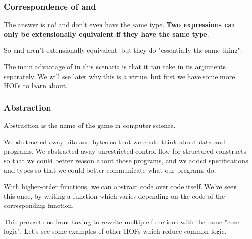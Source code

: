 \documentclass[aspectratio=169, handout]{beamer}
\begin{document}
\begin{frame}[fragile]
  \frametitle{Correspondence of  and }

  The answer is no!  and  don't even have the same type. 
  \textbf{Two expressions can only be extensionally equivalent if they have the same type}.

  \pause
  \vspace{\fill}

  So  and  aren't extensionally equivalent, but they do
  "essentially the same thing".

  \pause
  \vspace{\fill}

  The main advantage of  in this scenario is that it can take in its
  arguments separately. We will see later why this is a virtue, but first we have
  some more HOFs to learn about.
\end{frame}



\begin{frame}[fragile]
  \frametitle{Abstraction}

  Abstraction is the name of the game in computer science.
  
  \pause
  \vspace{\fill}

  We abstracted away bits and bytes so that we could think about data and programs.
  We abstracted away unrestricted control flow for structured constructs so that
  we could better reason about those programs, and we added specifications and types
  so that we could better communicate what our programs do.

  \pause
  \vspace{\fill}

  With higher-order functions, we can abstract code over code itself. We've seen this
  once, by writing a  function which varies depending on the code of the 
  corresponding  function.

  \pause
  \vspace{\fill}

  This prevents us from having to rewrite multiple  functions with the 
  same "core logic". Let's see some examples of other HOFs which reduce common logic.
\end{frame}
\end{document}
